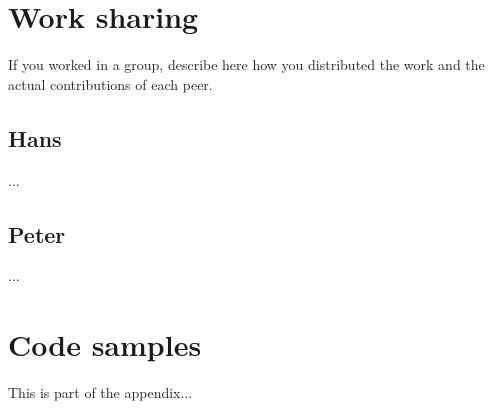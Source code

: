 \section{Work sharing}

If you worked in a group, describe here how you distributed the work and the actual contributions of each peer.

\subsection{Hans}
...

\subsection{Peter}
...

\section{Code samples}

This is part of the appendix...
